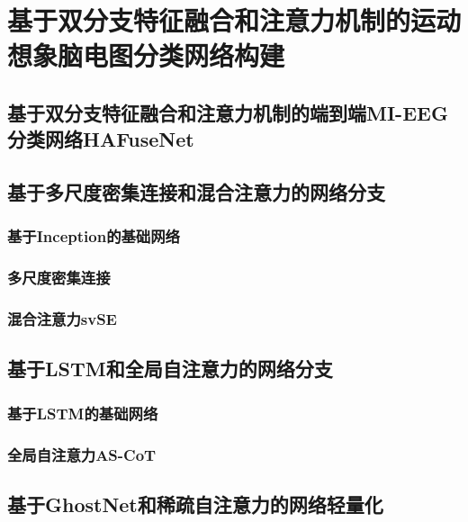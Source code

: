 
\chapter{基于双分支特征融合和注意力机制的运动想象脑电图分类网络构建}

\section{基于双分支特征融合和注意力机制的端到端MI-EEG分类网络HAFuseNet}

\section{基于多尺度密集连接和混合注意力的网络分支}

\subsection{基于Inception的基础网络}

\subsection{多尺度密集连接}

\subsection{混合注意力svSE}

\section{基于LSTM和全局自注意力的网络分支}

\subsection{基于LSTM的基础网络}

\subsection{全局自注意力AS-CoT}

\section{基于GhostNet和稀疏自注意力的网络轻量化}